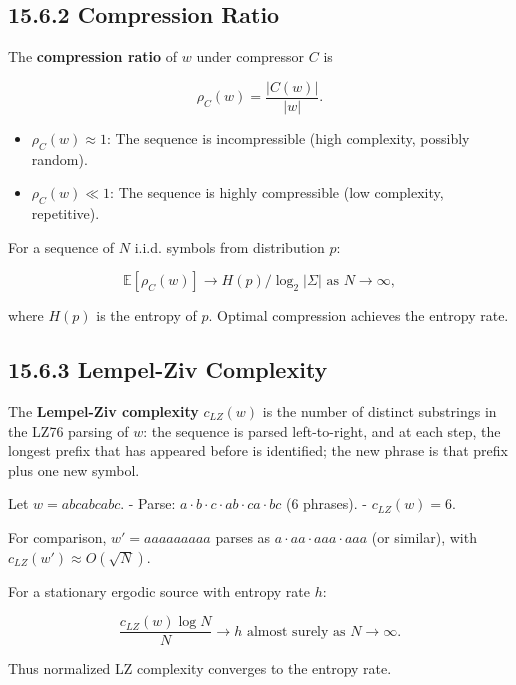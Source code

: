 \subsection{15.6.2 Compression Ratio}

\begin{definition}
The \textbf{compression ratio} of $w$ under compressor $C$ is

\[\rho_C(w) = \frac{|C(w)|}{|w|}.\]

\begin{itemize}
\item $\rho_C(w) \approx 1$: The sequence is incompressible (high complexity, possibly random).
\item $\rho_C(w) \ll 1$: The sequence is highly compressible (low complexity, repetitive).
\end{itemize}
\end{definition}

\begin{proposition}
For a sequence of $N$ i.i.d. symbols from distribution $p$:

\[\mathbb{E}[\rho_C(w)] \to H(p) / \log_2 |\Sigma| \text{ as } N \to \infty,\]

where $H(p)$ is the entropy of $p$. Optimal compression achieves the entropy rate.
\end{proposition}

\subsection{15.6.3 Lempel-Ziv Complexity}

\begin{definition}[LZ complexity]
The \textbf{Lempel-Ziv complexity} $c_{LZ}(w)$ is the number of distinct substrings in the LZ76 parsing of $w$: the sequence is parsed left-to-right, and at each step, the longest prefix that has appeared before is identified; the new phrase is that prefix plus one new symbol.
\end{definition}

\begin{example}
Let $w = abcabcabc$.
- Parse: $a \cdot b \cdot c \cdot ab \cdot ca \cdot bc$ (6 phrases).
- $c_{LZ}(w) = 6$.

For comparison, $w' = aaaaaaaaa$ parses as $a \cdot aa \cdot aaa \cdot aaa$ (or similar), with $c_{LZ}(w') \approx O(\sqrt{N})$.
\end{example}

\begin{theorem}
For a stationary ergodic source with entropy rate $h$:

\[\frac{c_{LZ}(w) \log N}{N} \to h \text{ almost surely as } N \to \infty.\]

Thus normalized LZ complexity converges to the entropy rate.
\end{theorem}

